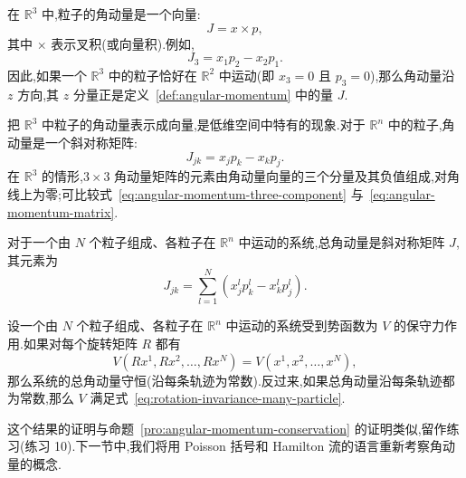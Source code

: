 在 $\mathbb{R}^{3}$ 中,粒子的角动量是一个向量:
\begin{equation}
  J=x\times p,
  \label{eq:angular-momentum-three-dimensional}
\end{equation}
其中 $\times$ 表示叉积(或向量积).例如,
\begin{equation}
  J_{3}=x_{1}p_{2}-x_{2}p_{1}.
  \label{eq:angular-momentum-three-component}
\end{equation}
因此,如果一个 $\mathbb{R}^{3}$ 中的粒子恰好在 $\mathbb{R}^{2}$ 中运动(即 $x_{3}=0$ 且 $p_{3}=0$),那么角动量沿 $z$ 方向,其 $z$ 分量正是定义~\ref{def:angular-momentum} 中的量 $J$.

把 $\mathbb{R}^{3}$ 中粒子的角动量表示成向量,是低维空间中特有的现象.对于 $\mathbb{R}^{n}$ 中的粒子,角动量是一个斜对称矩阵:
\begin{equation}
  J_{jk}=x_{j}p_{k}-x_{k}p_{j}.
  \label{eq:angular-momentum-matrix}
\end{equation}
在 $\mathbb{R}^{3}$ 的情形,$3\times3$ 角动量矩阵的元素由角动量向量的三个分量及其负值组成,对角线上为零;可比较式~\eqref{eq:angular-momentum-three-component} 与~\eqref{eq:angular-momentum-matrix}.

\begin{definition}[系统的总角动量]\label{def:total-angular-momentum}
对于一个由 $N$ 个粒子组成、各粒子在 $\mathbb{R}^{n}$ 中运动的系统,总角动量是斜对称矩阵 $J$,其元素为
\begin{equation}
  J_{jk}=\sum_{l=1}^{N}\left(x^{l}_{j}p^{l}_{k}-x^{l}_{k}p^{l}_{j}\right).
  \label{eq:total-angular-momentum}
\end{equation}
\end{definition}

\begin{theorem}[总角动量守恒]\label{thm:total-angular-momentum}
设一个由 $N$ 个粒子组成、各粒子在 $\mathbb{R}^{n}$ 中运动的系统受到势函数为 $V$ 的保守力作用.如果对每个旋转矩阵 $R$ 都有
\begin{equation}
  V(Rx^{1},Rx^{2},\ldots,Rx^{N})=V(x^{1},x^{2},\ldots,x^{N}),
  \label{eq:rotation-invariance-many-particle}
\end{equation}
那么系统的总角动量守恒(沿每条轨迹为常数).反过来,如果总角动量沿每条轨迹都为常数,那么 $V$ 满足式~\eqref{eq:rotation-invariance-many-particle}.
\end{theorem}

这个结果的证明与命题~\ref{pro:angular-momentum-conservation} 的证明类似,留作练习(练习 10).下一节中,我们将用 Poisson 括号和 Hamilton 流的语言重新考察角动量的概念.

